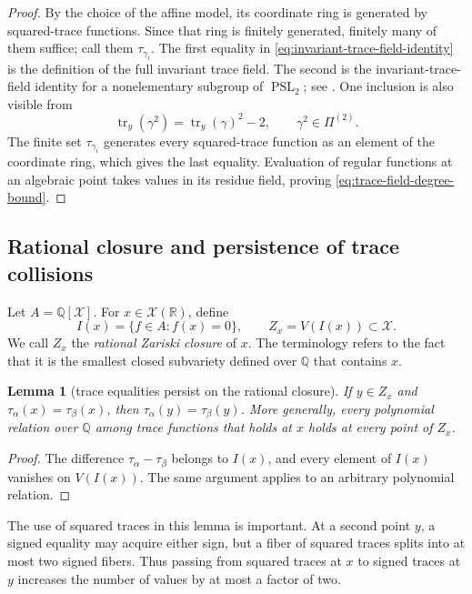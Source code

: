 \documentclass[11pt,reqno]{amsart}
\newtheorem{lemma}[theorem]{Lemma}
\theoremstyle{definition}
\theoremstyle{remark}
\newcommand{\R}{\mathbb R}
\newcommand{\Q}{\mathbb Q}
\newcommand{\Tr}{\operatorname{tr}}
\newcommand{\PSL}{\operatorname{PSL}}
\begin{document}
\begin{proof}
By the choice of the affine model, its coordinate ring is generated by
squared-trace functions.  Since that ring is finitely generated, finitely
many of them suffice; call them \(\tau_{\gamma_i}\).  The first equality in
\eqref{eq:invariant-trace-field-identity} is the definition of the full
invariant trace field.  The second is the invariant-trace-field identity for
a nonelementary subgroup of \(\PSL_2\); see
\cite[Lemma~3.5.6]{MaclachlanReid}.  One inclusion is also visible from
\[
 \Tr_y(\gamma^2)=\Tr_y(\gamma)^2-2,
 \qquad \gamma^2\in\Pi^{(2)}.
\]
The finite set \(\tau_{\gamma_i}\) generates every squared-trace function
as an element of the coordinate ring, which gives the last equality.
Evaluation of regular functions at an algebraic point takes values in its
residue field, proving \eqref{eq:trace-field-degree-bound}.
\end{proof}

\subsection{Rational closure and persistence of trace collisions}

Let \(A=\Q[\mathcal X]\).  For \(x\in\mathcal X(\R)\), define
\begin{equation}\label{eq:rational-ideal}
 I(x)=\{f\in A:f(x)=0\},\qquad
 Z_x=V(I(x))\subset\mathcal X.
\end{equation}
We call \(Z_x\) the \emph{rational Zariski closure} of \(x\).  The
terminology refers to the fact that it is the smallest closed subvariety
defined over \(\Q\) that contains \(x\).

\begin{lemma}[trace equalities persist on the rational closure]
\label{lem:collision-persistence}
If \(y\in Z_x\) and
\(\tau_\alpha(x)=\tau_\beta(x)\), then
\(\tau_\alpha(y)=\tau_\beta(y)\).  More generally, every polynomial
relation over \(\Q\) among trace functions that holds at \(x\) holds at
every point of \(Z_x\).
\end{lemma}

\begin{proof}
The difference \(\tau_\alpha-\tau_\beta\) belongs to \(I(x)\), and every
element of \(I(x)\) vanishes on \(V(I(x))\).  The same argument applies to
an arbitrary polynomial relation.
\end{proof}

The use of squared traces in this lemma is important.  At a second point
\(y\), a signed equality may acquire either sign, but a fiber of squared
traces splits into at most two signed fibers.  Thus passing from squared
traces at \(x\) to signed traces at \(y\) increases the number of values by
at most a factor of two.
\end{document}
